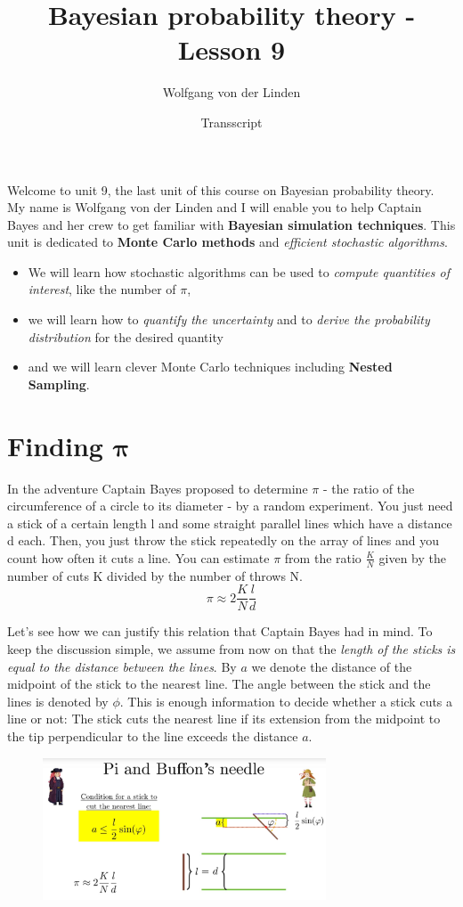 \documentclass[12pt, a4paper]{scrartcl}
\title{Bayesian probability theory - Lesson 9}
\author{Wolfgang von der Linden}
\date{Transscript}
\begin{document}
\setlength{\parindent}{0pt}
\maketitle
\onehalfspacing
Welcome to unit 9, the last unit of this course on Bayesian probability
theory. My name is Wolfgang von der Linden and I will enable you to
help Captain Bayes and her crew to get familiar with  \textbf{Bayesian simulation
techniques}.
This unit is dedicated to  \textbf{Monte Carlo methods} and  \textit{eﬃcient stochastic algorithms}.\\
\begin{itemize}
\item We will learn how stochastic algorithms can be used to \textit{compute quantities of interest}, like the number of $\pi$,
\item we will learn how to \textit{quantify the uncertainty} and to \textit{derive the probability distribution} for the desired quantity
\item and we will learn clever Monte Carlo techniques including  \textbf{Nested Sampling}.
\end{itemize}

\section*{Finding $\mathbf{\pi}$}
In the adventure Captain Bayes proposed to determine $\pi$ - the ratio of the circumference of a circle to its diameter - by a random experiment. 
You just need a stick of a certain length l
and some straight parallel lines which have a distance d each. Then, you just throw the stick repeatedly on the array of lines and you count how
often it cuts a line. You can estimate $\pi$ from the ratio $\frac KN$ given by the number of cuts K
divided by the number of throws N.\[\pi\approx 2\frac KN\frac ld\]

Let’s see how we can justify this relation that Captain Bayes had in mind.
To keep the discussion simple, we assume from now on that the \textit{length of the
sticks is equal to the distance between the lines}.
By $a$ we denote the distance of the midpoint of the stick to the nearest line.
The angle between the stick and the lines is denoted by $\phi$. This is enough
information to decide whether a stick cuts a line or not: 
The stick cuts the nearest line if its extension from the midpoint to the tip
perpendicular to the line exceeds the distance $a$.\\%
 \begin{figure}[H]
	\centering
	\includegraphics[width=0.75\textwidth]{9_1.png}
\end{figure}
\end{document}
